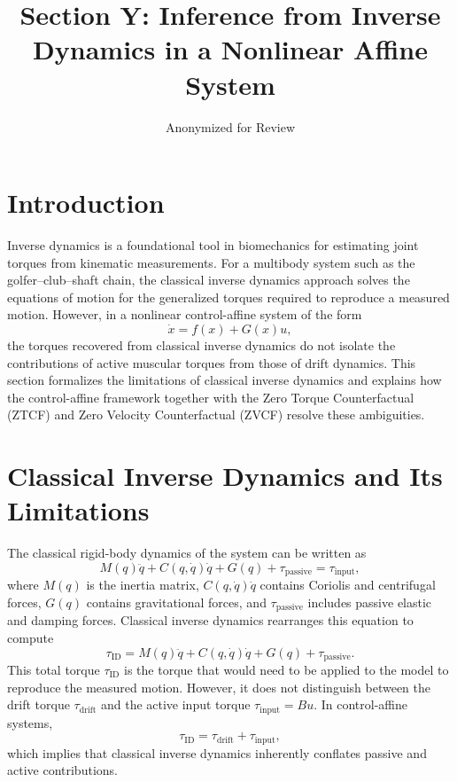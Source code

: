 \documentclass[12pt]{article}
\title{Section Y: Inference from Inverse Dynamics in a Nonlinear Affine System}
\author{Anonymized for Review}
\date{}
\begin{document}
\maketitle

\section{Introduction}

Inverse dynamics is a foundational tool in biomechanics for estimating joint torques from kinematic measurements. For a multibody system such as the golfer--club--shaft chain, the classical inverse dynamics approach solves the equations of motion for the generalized torques required to reproduce a measured motion. However, in a nonlinear control-affine system of the form
\begin{equation}
\dot{x} = f(x) + G(x)u,
\end{equation}
the torques recovered from classical inverse dynamics do not isolate the contributions of active muscular torques from those of drift dynamics. This section formalizes the limitations of classical inverse dynamics and explains how the control-affine framework together with the Zero Torque Counterfactual (ZTCF) and Zero Velocity Counterfactual (ZVCF) resolve these ambiguities.

\section{Classical Inverse Dynamics and Its Limitations}

The classical rigid-body dynamics of the system can be written as
\begin{equation}
M(q)\ddot{q} + C(q,\dot{q})\dot{q} + G(q) + \tau_{\mathrm{passive}} = \tau_{\mathrm{input}},
\end{equation}
where $M(q)$ is the inertia matrix, $C(q,\dot{q})\dot{q}$ contains Coriolis and centrifugal forces, $G(q)$ contains gravitational forces, and $\tau_{\mathrm{passive}}$ includes passive elastic and damping forces. Classical inverse dynamics rearranges this equation to compute
\begin{equation}
\tau_{\mathrm{ID}} = M(q)\ddot{q} + C(q,\dot{q})\dot{q} + G(q) + \tau_{\mathrm{passive}}.
\end{equation}
This total torque $\tau_{\mathrm{ID}}$ is the torque that would need to be applied to the model to reproduce the measured motion. However, it does not distinguish between the drift torque $\tau_{\mathrm{drift}}$ and the active input torque $\tau_{\mathrm{input}} = Bu$. In control-affine systems,
\begin{equation}
\tau_{\mathrm{ID}} = \tau_{\mathrm{drift}} + \tau_{\mathrm{input}},
\end{equation}
which implies that classical inverse dynamics inherently conflates passive and active contributions.
\end{document}
